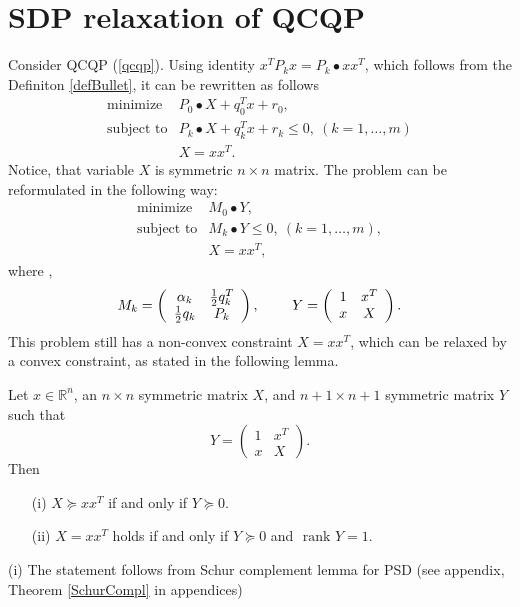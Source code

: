 \documentclass[10pt,oneside]{book}
\theoremstyle{definition}
\begin{document}
\section{SDP relaxation of QCQP}
Consider QCQP (\ref{qcqp}). Using identity $x^TP_kx = P_k\bullet xx^T$, which follows from the Definiton \ref{defBullet}, it can be rewritten as follows
\begin{equation} 
\label{1stStepToSDPr}
\begin{array}{ll}
\mbox{minimize}& P_0\bullet X + q_0^Tx +r_0, \\
\mbox{subject to}& P_k\bullet X+ q_k^Tx + r_k  \leq 0, \  (k = 1,\dots ,m)\\
& X = xx^T.
\end{array} 
\end{equation}
Notice, that variable $X$ is symmetric $n\times n$ matrix. 
 The problem can be reformulated in the following way:
 \begin{equation} 
\label{2ndStepToSDPr}
\begin{array}{ll}
\mbox{minimize}& M_0\bullet Y, \\
\mbox{subject to}& M_k\bullet Y \leq 0, \  (k = 1,\dots ,m),\\
& X = xx^T,
\end{array} 
\end{equation}
 where , 
\begin{equation}
M_k = \left(
\begin{array}{cc}
\alpha_k & {1\over 2}q_k^T \\
{1\over 2}q_k & P_k
\end{array}\right), 
\ \ \ \ \ \ \
Y =  \left(
\begin{array}{cc}
1 & x^T \\
x & X
\end{array}\right).
\end{equation}
 This problem still has a non-convex constraint $X = xx^T$, which can be relaxed by a convex constraint, as stated in the following lemma.
  
\lema 
\label{relaxRank1Lemma}
Let $x\in \mathbb{R}^n$, an $n\times n$ symmetric matrix $X$, and $n+1\times n+1$ symmetric matrix $Y$ such that 
$$Y =  \left(
\begin{array}{cc}
1 & x^T \\
x & X
\end{array}\right). 
$$  Then
\begin{itemize}
\item[(i)] $X\succeq xx^T$ if and only if $Y\succeq 0$.
\item[(ii)] $X=xx^T$ holds if and only if $Y\succeq 0$ and \rm $\mbox{ rank } Y=1$. 
\end{itemize}
\proof (i) The statement follows from Schur complement lemma for PSD (see appendix, Theorem \ref{SchurCompl} in appendices) 
\end{document}
